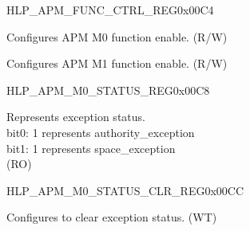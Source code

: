 \begin{register}{H}{LP\_APM\_FUNC\_CTRL\_REG}{0x00C4}\label{regdesc:LPAPMFUNCCTRLREG}
%
%
%
\regnewline%
\begin{regdesc}\begin{reglist}
\label{fielddesc:LPAPMM0FUNCEN}\item [LP\_APM\_M0\_FUNC\_EN] Configures APM M0 function enable. (R/W)
\label{fielddesc:LPAPMM1FUNCEN}\item [LP\_APM\_M1\_FUNC\_EN] Configures APM M1 function enable. (R/W)
\end{reglist}\end{regdesc}
\end{register}


\begin{register}{H}{LP\_APM\_M0\_STATUS\_REG}{0x00C8}\label{regdesc:LPAPMM0STATUSREG}
%
%
\regnewline%
\begin{regdesc}\begin{reglist}
\label{fielddesc:LPAPMM0EXCEPTIONSTATUS}\item [LP\_APM\_M0\_EXCEPTION\_STATUS] Represents exception status.\\ 
bit0: 1 represents authority\_exception \\ 
bit1: 1 represents space\_exception  \\ (RO)
\end{reglist}\end{regdesc}
\end{register}


\begin{register}{H}{LP\_APM\_M0\_STATUS\_CLR\_REG}{0x00CC}\label{regdesc:LPAPMM0STATUSCLRREG}
%
%
\regnewline%
\begin{regdesc}\begin{reglist}
\label{fielddesc:LPAPMM0REGIONSTATUSCLR}\item [LP\_APM\_M0\_REGION\_STATUS\_CLR] Configures to clear exception status. (WT)
\end{reglist}\end{regdesc}
\end{register}


